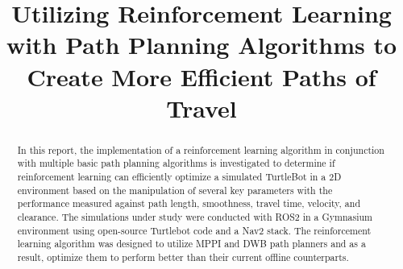 \documentclass[conference]{IEEEtran}
\begin{document}
\title{Utilizing Reinforcement Learning with Path Planning Algorithms to Create More Efficient Paths of Travel\\
}

\author{
\and
{}
\and
{}
}

\maketitle

\begin{abstract}
In this report, the implementation of a reinforcement learning algorithm in conjunction with multiple basic path planning algorithms is investigated
to determine if reinforcement learning can efficiently optimize a simulated TurtleBot in a 2D environment based on the manipulation of several key
parameters with the performance measured against path length, smoothness, travel time, velocity, and clearance. The simulations under study were
conducted with ROS2 in a Gymnasium environment using open-source Turtlebot code and a Nav2 stack. The reinforcement learning algorithm was designed to
utilize MPPI and DWB path planners and as a result, optimize them to perform better than their current offline counterparts.
\end{abstract}


\end{document}
